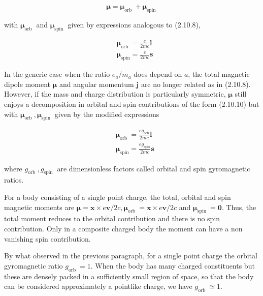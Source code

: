 \documentclass{article}
\begin{document}
\begin{equation*}
\boldsymbol{\mu}=\boldsymbol{\mu}_{\text {orb }}+\boldsymbol{\mu}_{\text {spin }} \tag{2.10.10}
\end{equation*}
 
with $\boldsymbol{\mu}_{\text {orb }}$ and $\boldsymbol{\mu}_{\text {spin }}$ given by expressions analogous to (2.10.8),
 
\begin{align*}
& \boldsymbol{\mu}_{\text {orb }}=\frac{e}{2 m c} \boldsymbol{l}  \tag{2.10.11}\\
& \boldsymbol{\mu}_{\mathrm{spin}}=\frac{e}{2 m c} \boldsymbol{s} \tag{2.10.12}
\end{align*}
 

In the generic case when the ratio $e_{a} / m_{a}$ does depend on $a$, the total magnetic dipole moment $\boldsymbol{\mu}$ and angular momentum $\boldsymbol{j}$ are no longer related as in (2.10.8). However, if the mass and charge distribution is particularly symmetric, $\boldsymbol{\mu}$ still enjoys a decomposition in orbital and spin contributions of the form (2.10.10) but with $\boldsymbol{\mu}_{\text {orb }}, \boldsymbol{\mu}_{\text {spin }}$ given by the modified expressions
 
\begin{align*}
& \boldsymbol{\mu}_{\text {orb }}=\frac{e g_{\mathrm{orb}}}{2 m c} \boldsymbol{l}  \tag{2.10.13}\\
& \boldsymbol{\mu}_{\mathrm{spin}}=\frac{e g_{\mathrm{spin}}}{2 m c} \boldsymbol{s} \tag{2.10.14}
\end{align*}
 
where $g_{\text {orb }}, g_{\text {spin }}$ are dimensionless factors called orbital and spin gyromagnetic ratios.

For a body consisting of a single point charge, the total, orbital and spin magnetic moments are $\boldsymbol{\mu}=\boldsymbol{x} \times e \boldsymbol{v} / 2 c, \boldsymbol{\mu}_{\text {orb }}=\boldsymbol{x} \times e \boldsymbol{v} / 2 c$ and $\boldsymbol{\mu}_{\text {spin }}=\mathbf{0}$. Thus, the total moment reduces to the orbital contribution and there is no spin contribution. Only in a composite charged body the moment can have a non vanishing spin contribution.

By what observed in the previous paragraph, for a single point charge the orbital gyromagnetic ratio $g_{\text {orb }}=1$. When the body has many charged constituents but these are densely packed in a sufficiently small region of space, so that the body can be considered approximately a pointlike charge, we have $g_{\text {orb }} \simeq 1$.
\end{document}
